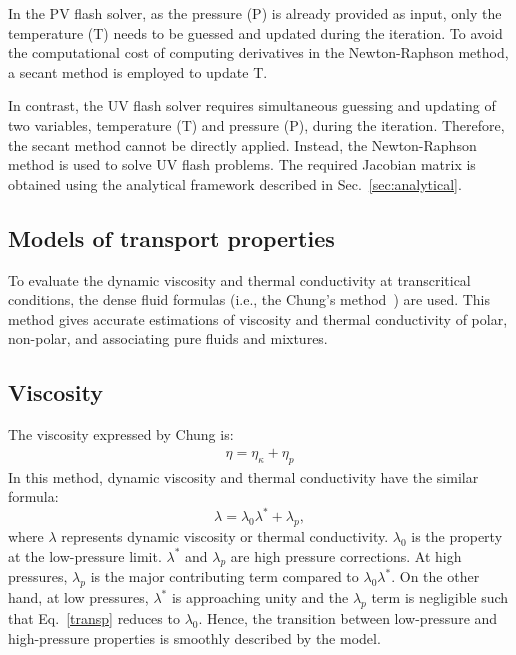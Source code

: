 In the PV flash solver, as the pressure (P) is already provided as input, only the temperature (T) needs to be guessed and updated during the iteration. To avoid the computational cost of computing derivatives in the Newton-Raphson method, a secant method is employed to update T.


In contrast, the UV flash solver requires simultaneous guessing and updating of two variables,  temperature (T) and pressure (P), during the iteration. Therefore, the secant method cannot be directly applied. Instead, the Newton-Raphson method is used to solve UV flash problems. The required Jacobian matrix is obtained using the analytical framework described in Sec.~\ref{sec:analytical}.



\subsection{Models of transport properties}
To evaluate the dynamic viscosity and thermal conductivity at transcritical conditions, the dense fluid formulas (i.e., the Chung's method~\cite{chung1988generalized}) are used. This method gives accurate estimations of viscosity and thermal conductivity of polar, non-polar, and associating pure fluids and mixtures. 
\subsection{Viscosity}
The viscosity expressed by Chung is: 
\begin{align}
\eta = \eta_{\kappa} +\eta_p 
\end{align}
In this method, dynamic viscosity and thermal conductivity have the similar formula:
\begin{equation}
\lambda=\lambda_0 \lambda^*+\lambda_p, \label{transp}
\end{equation}
where $\lambda$ represents dynamic viscosity or thermal conductivity. $\lambda_0$ is the property at the low-pressure limit. $\lambda^*$ and $\lambda_p$ are high pressure corrections. At high pressures, $\lambda_p$ is the major contributing term compared to $\lambda_0 \lambda^*$. On the other hand, at low pressures, $\lambda^*$ is approaching unity and the $\lambda_p$ term is negligible such that Eq.~\ref{transp} reduces to $\lambda_0$. Hence, the transition between low-pressure and high-pressure properties is smoothly described by the model. 

